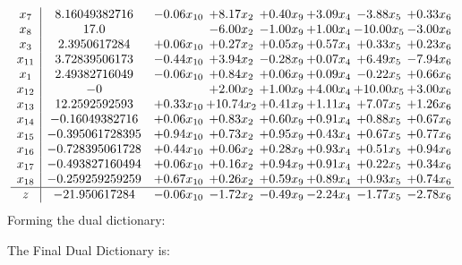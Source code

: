\documentclass[8pt]{article}
\begin{document}
\[\begin{array}{c| c c@{\hskip 2pt} c@{\hskip 2pt} c@{\hskip 2pt} c@{\hskip 2pt} c@{\hskip 2pt} c@{\hskip 2pt} }
 x_{7}   &  8.16049382716 & -0.06 x_{10} & +  8.17 x_{2} & +  0.40 x_{9} & +  3.09 x_{4} & -3.88 x_{5} & +  0.33 x_{6}\\
 x_{8}   &  17.0  &   & -6.00 x_{2} & -1.00 x_{9} & +  1.00 x_{4} & -10.00 x_{5} & -3.00 x_{6}\\
 x_{3}   &  2.3950617284 & +  0.06 x_{10} & +  0.27 x_{2} & +  0.05 x_{9} & +  0.57 x_{4} & +  0.33 x_{5} & +  0.23 x_{6}\\
 x_{11}   &  3.72839506173 & -0.44 x_{10} & +  3.94 x_{2} & -0.28 x_{9} & +  0.07 x_{4} & +  6.49 x_{5} & -7.94 x_{6}\\
 x_{1}   &  2.49382716049 & -0.06 x_{10} & +  0.84 x_{2} & +  0.06 x_{9} & +  0.09 x_{4} & -0.22 x_{5} & +  0.66 x_{6}\\
 x_{12}   &  -0  &   & +  2.00 x_{2} & +  1.00 x_{9} & +  4.00 x_{4} & + 10.00 x_{5} & +  3.00 x_{6}\\
 x_{13}   &  12.2592592593 & +  0.33 x_{10} & + 10.74 x_{2} & +  0.41 x_{9} & +  1.11 x_{4} & +  7.07 x_{5} & +  1.26 x_{6}\\
 x_{14}   &  -0.16049382716 & +  0.06 x_{10} & +  0.83 x_{2} & +  0.60 x_{9} & +  0.91 x_{4} & +  0.88 x_{5} & +  0.67 x_{6}\\
 x_{15}   &  -0.395061728395 & +  0.94 x_{10} & +  0.73 x_{2} & +  0.95 x_{9} & +  0.43 x_{4} & +  0.67 x_{5} & +  0.77 x_{6}\\
 x_{16}   &  -0.728395061728 & +  0.44 x_{10} & +  0.06 x_{2} & +  0.28 x_{9} & +  0.93 x_{4} & +  0.51 x_{5} & +  0.94 x_{6}\\
 x_{17}   &  -0.493827160494 & +  0.06 x_{10} & +  0.16 x_{2} & +  0.94 x_{9} & +  0.91 x_{4} & +  0.22 x_{5} & +  0.34 x_{6}\\
 x_{18}   &  -0.259259259259 & +  0.67 x_{10} & +  0.26 x_{2} & +  0.59 x_{9} & +  0.89 x_{4} & +  0.93 x_{5} & +  0.74 x_{6}\\
\hline
z    &  -21.950617284 & -0.06 x_{10} & -1.72 x_{2} & -0.49 x_{9} & -2.24 x_{4} & -1.77 x_{5} & -2.78 x_{6}\\
\end{array}\]
Forming the dual dictionary:

The Final Dual Dictionary is: 
\end{document}
